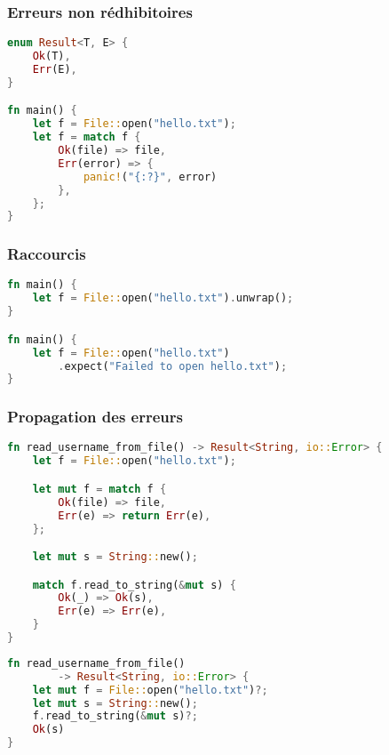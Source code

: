 \begin{frame}[fragile]
  \frametitle{Erreurs non rédhibitoires}
  \begin{lstlisting}[language=rust, basicstyle=\small{}]
enum Result<T, E> {
    Ok(T),
    Err(E),
}

fn main() {
    let f = File::open("hello.txt");
    let f = match f {
        Ok(file) => file,
        Err(error) => {
            panic!("{:?}", error)
        },
    };
}
  \end{lstlisting}
\end{frame}

\begin{frame}[fragile]
  \frametitle{Raccourcis}
  \begin{lstlisting}[language=rust]
fn main() {
    let f = File::open("hello.txt").unwrap();
}

fn main() {
    let f = File::open("hello.txt")
        .expect("Failed to open hello.txt");
}
  \end{lstlisting}
\end{frame}

\begin{frame}[fragile]
  \frametitle{Propagation des erreurs}
  \begin{lstlisting}[language=rust, basicstyle=\tiny{}]
fn read_username_from_file() -> Result<String, io::Error> {
    let f = File::open("hello.txt");

    let mut f = match f {
        Ok(file) => file,
        Err(e) => return Err(e),
    };

    let mut s = String::new();

    match f.read_to_string(&mut s) {
        Ok(_) => Ok(s),
        Err(e) => Err(e),
    }
}
  \end{lstlisting}
\end{frame}

\begin{frame}[fragile]
  \begin{lstlisting}[language=rust]
fn read_username_from_file()
        -> Result<String, io::Error> {
    let mut f = File::open("hello.txt")?;
    let mut s = String::new();
    f.read_to_string(&mut s)?;
    Ok(s)
}
  \end{lstlisting}
\end{frame}
